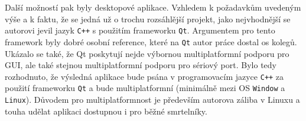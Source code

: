 Další možností pak byly desktopové aplikace. Vzhledem k požadavkům uvedeným
výše a k faktu, že se jedná už o trochu rozsáhlější projekt, jako nejvhodnější
se autorovi jevil jazyk \texttt{C++} s použitím frameworku \texttt{Qt}.
Argumentem pro tento framework byly dobré osobní reference, které na
\texttt{Qt} autor práce dostal os kolegů. Ukázalo se také, že Qt poskytují
nejde výbornou multiplatformní podporu pro GUI, ale také stejnou
multiplatformní podporu pro sériový port. Bylo tedy rozhodnuto, že výsledná
aplikace bude psána v programovacím jazyce \texttt{C++} za použití frameworku
\texttt{Qt} a bude multiplatformní (minimálně mezi OS \texttt{Window} a
\texttt{Linux}). Důvodem pro multiplatformnost je především autorova záliba
v Linuxu a touha udělat aplikaci dostupnou i pro běžné smrtelníky.
